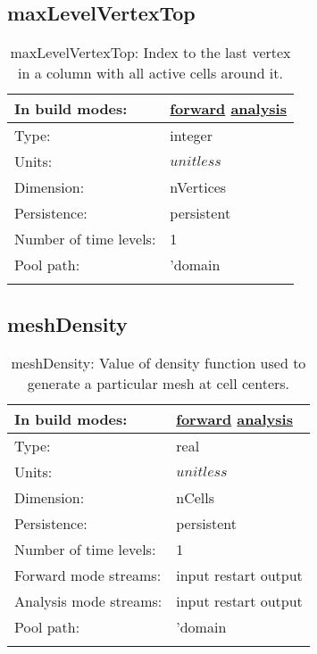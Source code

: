 \subsection[maxLevelVertexTop]{maxLevelVertexTop}
\label{subsec:var_sec_mesh_maxLevelVertexTop}
\begin{center}
\begin{longtable}{| p{2.0in} | p{4.0in} |}
        \hline 
        In build modes: & \hyperref[subsec:forward_var_tab_mesh]{forward} \hyperref[subsec:analysis_var_tab_mesh]{analysis} \\
        \hline 
        Type: & integer \\
        \hline 
        Units: & $unitless$ \\
        \hline 
        Dimension: & nVertices \\
        \hline 
        Persistence: & persistent \\
        \hline 
        Number of time levels: & 1 \\
        \hline 
            Pool path: & 'domain %
 \\
		 \hline 
    \caption{maxLevelVertexTop: Index to the last vertex in a column with all active cells around it.}
\end{longtable}
\end{center}
\subsection[meshDensity]{meshDensity}
\label{subsec:var_sec_mesh_meshDensity}
\begin{center}
\begin{longtable}{| p{2.0in} | p{4.0in} |}
        \hline 
        In build modes: & \hyperref[subsec:forward_var_tab_mesh]{forward} \hyperref[subsec:analysis_var_tab_mesh]{analysis} \\
        \hline 
        Type: & real \\
        \hline 
        Units: & $unitless$ \\
        \hline 
        Dimension: & nCells \\
        \hline 
        Persistence: & persistent \\
        \hline 
        Number of time levels: & 1 \\
        \hline 
		 Forward mode streams: &  input restart output \\
        \hline 
		 Analysis mode streams: &  input restart output \\
        \hline 
            Pool path: & 'domain %
 \\
		 \hline 
    \caption{meshDensity: Value of density function used to generate a particular mesh at cell centers.}
\end{longtable}
\end{center}
